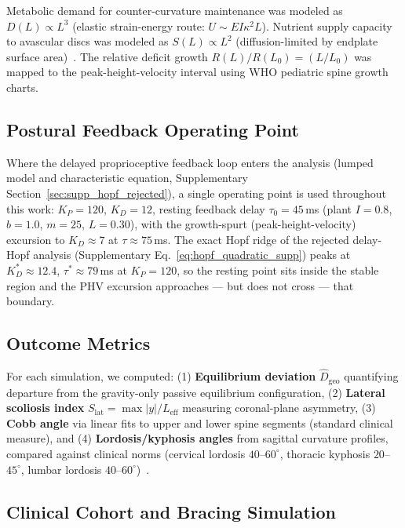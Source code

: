 Metabolic demand for counter-curvature maintenance was modeled as $D(L) \propto L^3$ (elastic strain-energy route: $U \sim EI\kappa^2 L$). Nutrient supply capacity to avascular discs was modeled as $S(L) \propto L^2$ (diffusion-limited by endplate surface area)~\cite{urban2004nutrition}. The relative deficit growth $R(L)/R(L_0)=(L/L_0)$ was mapped to the peak-height-velocity interval using WHO pediatric spine growth charts.

\subsection{Postural Feedback Operating Point}
\label{sec:operating_point}

Where the delayed proprioceptive feedback loop enters the analysis (lumped model and characteristic equation, Supplementary Section~\ref{sec:supp_hopf_rejected}), a single operating point is used throughout this work: $K_P = 120$, $K_D = 12$, resting feedback delay $\tau_0 = 45$\,ms (plant $I = 0.8$, $b = 1.0$, $m = 25$, $L = 0.30$), with the growth-spurt (peak-height-velocity) excursion to $K_D \approx 7$ at $\tau \approx 75$\,ms. The exact Hopf ridge of the rejected delay-Hopf analysis (Supplementary Eq.~\ref{eq:hopf_quadratic_supp}) peaks at $K_D^* \approx 12.4$, $\tau^* \approx 79$\,ms at $K_P = 120$, so the resting point sits inside the stable region and the PHV excursion approaches --- but does not cross --- that boundary.

\subsection{Outcome Metrics}

For each simulation, we computed: (1) \textbf{Equilibrium deviation} $\widehat{D}_{\mathrm{geo}}$ quantifying departure from the gravity-only passive equilibrium configuration, (2) \textbf{Lateral scoliosis index} $S_{\mathrm{lat}} = \max|y|/L_{\mathrm{eff}}$ measuring coronal-plane asymmetry, (3) \textbf{Cobb angle} via linear fits to upper and lower spine segments (standard clinical measure), and (4) \textbf{Lordosis/kyphosis angles} from sagittal curvature profiles, compared against clinical norms (cervical lordosis $40$--$60^{\circ}$, thoracic kyphosis $20$--$45^{\circ}$, lumbar lordosis $40$--$60^{\circ}$)~\cite{white1990clinical}.

\subsection{Clinical Cohort and Bracing Simulation}

